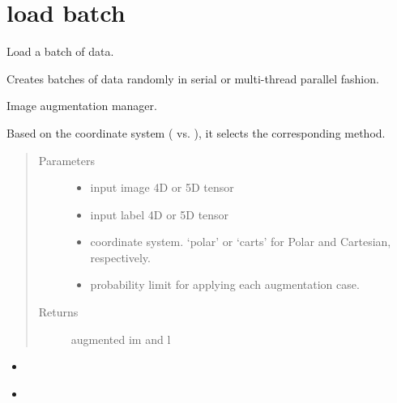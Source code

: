 \documentclass[letterpaper,10pt,english]{sphinxmanual}
\begin{document}
\section{load batch}
\label{\detokenize{index:module-util.load_batch}}\label{\detokenize{index:load-batch}}
Load a batch of data.

Creates batches of data randomly in serial or multi-thread parallel fashion.

\begin{fulllineitems}
\label{\detokenize{index:util.load_batch.img_aug}}
Image augmentation manager.

Based on the coordinate system ( vs.  ),  it selects the corresponding method.
\begin{quote}\begin{description}
\item[{Parameters}] \leavevmode\begin{itemize}
\item {} 
 \textendash{} input image 4D or 5D tensor

\item {} 
 \textendash{} input label 4D or 5D tensor

\item {} 
 \textendash{} coordinate system.  ‘polar’ or ‘carts’ for Polar and Cartesian,  respectively.

\item {} 
 \textendash{} probability limit for applying each augmentation case.

\end{itemize}

\item[{Returns}] \leavevmode
augmented im and l

\end{description}\end{quote}



\begin{itemize}
\item {} 
{\hyperref[\detokenize{index:util.load_batch.img_aug_carts}]{}}

\item {} 
{\hyperref[\detokenize{index:util.load_batch.img_aug_polar}]{}}

\end{itemize}



\end{fulllineitems}
\end{document}
